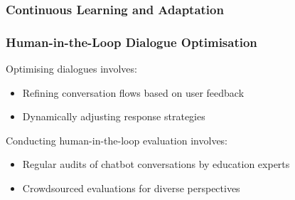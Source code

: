 \documentclass[14pt,a4paper]{article}
\begin{document}
\begin{multicols}{2}
\subsubsection{Continuous Learning and Adaptation}

\subsubsection*{Human-in-the-Loop Dialogue Optimisation}
Optimising dialogues \textit{\parencite[pp. 50-100]{Gao2023}} involves:
\begin{itemize}
    \item Refining conversation flows based on user feedback
    \item Dynamically adjusting response strategies
\end{itemize}

Conducting human-in-the-loop evaluation \textit{\parencite[pp. 30-60]{Vaughan2024}} involves:
\begin{itemize}
    \item Regular audits of chatbot conversations by education experts
    \item Crowdsourced evaluations for diverse perspectives
\end{itemize}


%





\end{multicols}
\end{document}
